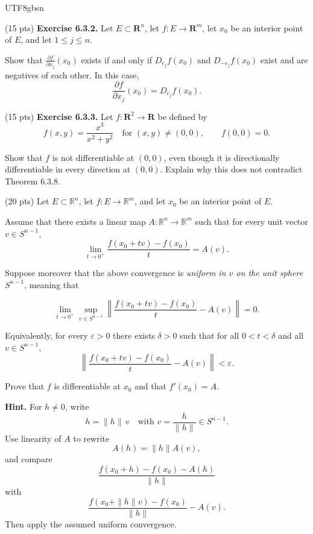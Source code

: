 \documentclass[addpoints]{exam}
\theoremstyle{definition}
\begin{document}
\begin{CJK*}{UTF8}{gbsn}
\begin{questions}
\begin{solution} 
 
 \end{solution}

\question (15 pts) \textbf{Exercise 6.3.2.}
Let $E \subset \mathbf{R}^n$, let $f : E \to \mathbf{R}^m$, let $x_0$ be an interior point of $E$, and let $1 \le j \le n$.

Show that $\frac{\partial f}{\partial x_j}(x_0)$ exists if and only if
$D_{e_j}f(x_0)$ and $D_{-e_j}f(x_0)$ exist and are negatives of each other.
In this case,
$$
\frac{\partial f}{\partial x_j}(x_0)
=
D_{e_j}f(x_0).
$$


\begin{solution} 

\end{solution}

\question (15 pts)
\textbf{Exercise 6.3.3.}
Let $f : \mathbf{R}^2 \to \mathbf{R}$ be defined by
$$
f(x,y)
=
\frac{x^3}{x^2 + y^2}
\quad \text{for } (x,y) \ne (0,0),
\qquad
f(0,0) = 0.
$$

Show that $f$ is not differentiable at $(0,0)$, even though it is
directionally differentiable in every direction at $(0,0)$.
Explain why this does not contradict Theorem 6.3.8.

 

\begin{solution} 

\end{solution}

\question (20 pts) 
Let $E\subset \mathbb{R}^n$, let $f:E\to \mathbb{R}^m$, and let $x_0$ be an interior point of $E$.

Assume that there exists a linear map $A:\mathbb{R}^n\to \mathbb{R}^m$
such that for every unit vector $v\in S^{n-1}$,
\[
\lim_{t\to 0^+}
\frac{f(x_0+t v)-f(x_0)}{t}
=
A(v).
\]

Suppose moreover that the above convergence is \emph{uniform in $v$ on the unit sphere $S^{n-1}$}, meaning that

\[
\lim_{t\to 0^+}
\sup_{v\in S^{n-1}}
\left\|
\frac{f(x_0+t v)-f(x_0)}{t}
-
A(v)
\right\|
=
0.
\]

Equivalently, for every $\varepsilon>0$ there exists $\delta>0$
such that for all $0<t<\delta$ and all $v\in S^{n-1}$,
\[
\left\|
\frac{f(x_0+t v)-f(x_0)}{t}
-
A(v)
\right\|
<
\varepsilon.
\]

Prove that $f$ is differentiable at $x_0$ and that $f'(x_0)=A$.

\medskip
\noindent\textbf{Hint.}
For $h\neq 0$, write
\[
h=\|h\|\,v
\quad \text{with } v=\frac{h}{\|h\|}\in S^{n-1}.
\]
Use linearity of $A$ to rewrite
\[
A(h)=\|h\|A(v),
\]
and compare
\[
\frac{f(x_0+h)-f(x_0)-A(h)}{\|h\|}
\]
with
\[
\frac{f(x_0+\|h\|v)-f(x_0)}{\|h\|}-A(v).
\]
Then apply the assumed uniform convergence.
\begin{solution} 
\end{solution}


\end{questions}
\end{CJK*}
\end{document}
